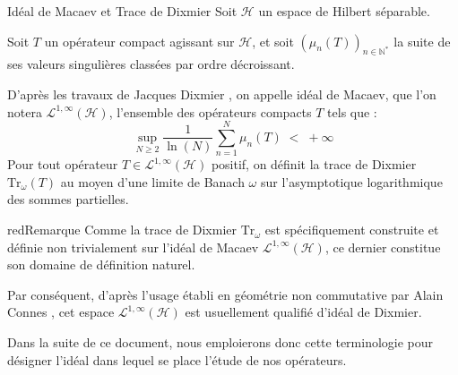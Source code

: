 \documentclass[Riemann_Hypothesis.tex]{subfiles}
\begin{document}
\begin{DefNef}[label=df:IdealDixmierMacaev_fr]{Idéal de Macaev et Trace de Dixmier}
    Soit $\mathcal{H}$ un espace de Hilbert séparable. \par
    Soit $T$ un opérateur compact agissant sur $\mathcal{H}$, et soit $(\mu_n(T))_{n \in \mathbb{N}^*}$ la suite de ses valeurs singulières classées par ordre décroissant. \par
    D'après les travaux de Jacques Dixmier \cite{dixmier1966_trace}, on appelle idéal de Macaev, que l'on notera $\mathcal{L}^{1,\infty}(\mathcal{H})$, l'ensemble des opérateurs compacts $T$ tels que :
    \begin{equation*}
        \sup_{N \geq 2} \frac{1}{\ln(N)} \sum_{n=1}^{N} \mu_n(T) \;<\; +\infty
    \end{equation*}
    Pour tout opérateur $T \in \mathcal{L}^{1,\infty}(\mathcal{H})$ positif, on définit la trace de Dixmier $\mathrm{Tr}_\omega(T)$ au moyen d'une limite de Banach $\omega$ sur l'asymptotique logarithmique des sommes partielles.
\end{DefNef}
\begin{ppbox}{red}{Remarque}
    Comme la trace de Dixmier $\mathrm{Tr}_\omega$ est spécifiquement construite et définie non trivialement sur l'idéal de Macaev $\mathcal{L}^{1,\infty}(\mathcal{H})$, ce dernier constitue son domaine de définition naturel. \par
    Par conséquent, d'après l'usage établi en géométrie non commutative par Alain Connes \cite{connes1999_trace}, cet espace $\mathcal{L}^{1,\infty}(\mathcal{H})$ est usuellement qualifié d'idéal de Dixmier. \par
    Dans la suite de ce document, nous emploierons donc cette terminologie pour désigner l'idéal dans lequel se place l'étude de nos opérateurs.
\end{ppbox}
\end{document}
